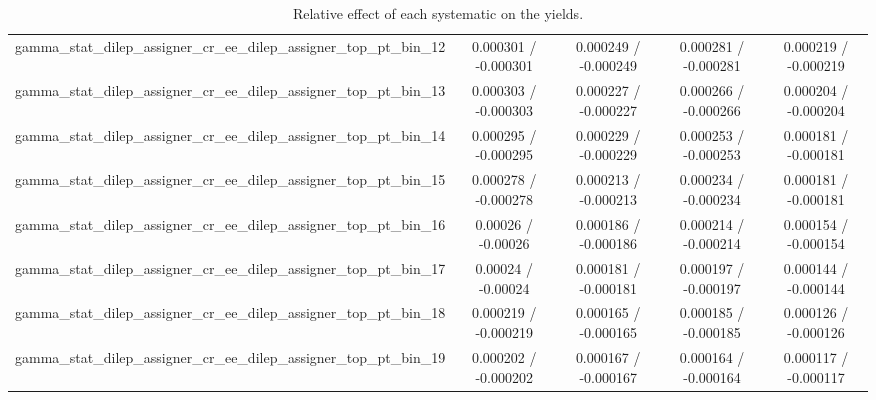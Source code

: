 \documentclass[10pt]{article}
\begin{document}
\begin{table}[htbp]
\begin{center}
\begin{tabular}{|c|c|c|c|c|}
  gamma_stat_dilep_assigner_cr_ee_dilep_assigner_top_pt_bin_12 & 0.000301 / -0.000301 & 0.000249 / -0.000249 & 0.000281 / -0.000281 & 0.000219 / -0.000219 \\ 
  gamma_stat_dilep_assigner_cr_ee_dilep_assigner_top_pt_bin_13 & 0.000303 / -0.000303 & 0.000227 / -0.000227 & 0.000266 / -0.000266 & 0.000204 / -0.000204 \\ 
  gamma_stat_dilep_assigner_cr_ee_dilep_assigner_top_pt_bin_14 & 0.000295 / -0.000295 & 0.000229 / -0.000229 & 0.000253 / -0.000253 & 0.000181 / -0.000181 \\ 
  gamma_stat_dilep_assigner_cr_ee_dilep_assigner_top_pt_bin_15 & 0.000278 / -0.000278 & 0.000213 / -0.000213 & 0.000234 / -0.000234 & 0.000181 / -0.000181 \\ 
  gamma_stat_dilep_assigner_cr_ee_dilep_assigner_top_pt_bin_16 & 0.00026 / -0.00026 & 0.000186 / -0.000186 & 0.000214 / -0.000214 & 0.000154 / -0.000154 \\ 
  gamma_stat_dilep_assigner_cr_ee_dilep_assigner_top_pt_bin_17 & 0.00024 / -0.00024 & 0.000181 / -0.000181 & 0.000197 / -0.000197 & 0.000144 / -0.000144 \\ 
  gamma_stat_dilep_assigner_cr_ee_dilep_assigner_top_pt_bin_18 & 0.000219 / -0.000219 & 0.000165 / -0.000165 & 0.000185 / -0.000185 & 0.000126 / -0.000126 \\ 
  gamma_stat_dilep_assigner_cr_ee_dilep_assigner_top_pt_bin_19 & 0.000202 / -0.000202 & 0.000167 / -0.000167 & 0.000164 / -0.000164 & 0.000117 / -0.000117 \\ 
\hline 
\end{tabular} 
\caption{Relative effect of each systematic on the yields.} 
\end{center} 
\end{table} 
\end{document}
